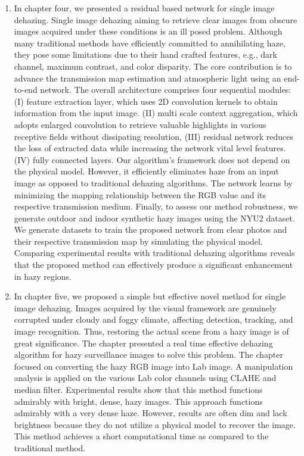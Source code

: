 \documentclass[doctor,english,listoffigures,listoftables]{thesis-uestc}
\begin{document}
\begin{enumerate}
    \item In chapter four, we presented a residual based network for single image dehazing. Single image dehazing aiming to retrieve clear images from obscure images acquired under these conditions is an ill posed problem. Although many traditional methods have efficiently committed to annihilating haze, they pose some limitations due to their hand crafted features, e.g., dark channel, maximum contrast, and color disparity. The core contribution is to advance the transmission map estimation and atmospheric light using an end-to-end network. The overall architecture comprises four sequential modules: (I) feature extraction layer, which uses 2D convolution kernels to obtain information from the input image. (II) multi scale context aggregation, which adopts enlarged convolution to retrieve valuable highlights in various receptive fields without dissipating resolution, (III) residual network reduces the loss of extracted data while increasing the network vital level features. (IV) fully connected layers. Our algorithm’s framework does not depend on the physical model. However, it efficiently eliminates haze from an input image as opposed to traditional dehazing algorithms. The network learns by minimizing the mapping relationship between the RGB value and its respective transmission medium. Finally, to assess our method robustness, we generate outdoor and indoor synthetic hazy images using the NYU2 dataset. We generate datasets to train the proposed network from clear photos and their respective transmission map by simulating the physical model. Comparing experimental results with traditional dehazing algorithms reveals that the proposed method can effectively produce a significant enhancement in hazy regions.
    
    
    \item  In chapter five, we proposed a simple but effective novel method for single image dehazing.  Images acquired by the visual framework are genuinely corrupted under cloudy and foggy climate, affecting detection, tracking, and image recognition. Thus, restoring the actual scene from a hazy image is of great significance. The chapter presented a real time effective dehazing algorithm for hazy surveillance images to solve this problem. The chapter focused on converting the hazy RGB image into Lab image. A manipulation analysis is applied on the various Lab color channels using CLAHE and median filter. Experimental results show that this method functions admirably with bright, dense, hazy images. This approach functions admirably with a very dense haze. However, results are often dim and lack brightness because they do not utilize a physical model to recover the image. This method achieves a short computational time as compared to the traditional method. 


\end{enumerate}
\end{document}
